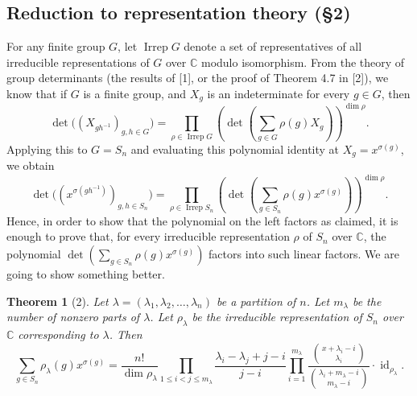 \documentclass[UTF8,11pt,a4paper]{ctexart}
\newtheorem*{theorem}{Theorem}
\theoremstyle{definition}\newtheorem*{definition}{Definition}
\theoremstyle{remark}\newtheorem*{remark}{Remark}
\DeclareMathOperator{\id}{id}
\newcommand{\C}{\mathbb C}
\begin{document}
\subsection*{Reduction to representation theory (\S2)}
For any finite group $G$, let $\operatorname{Irrep}G$ denote a set of representatives of all irreducible representations of $G$ over $\C$ modulo isomorphism. From the theory of group determinants (the results of [1], or the proof of Theorem 4.7 in [2]), we know that if $G$ is a finite group, and $X_g$ is an indeterminate for every $g\in G$, then
\[
\det\bigl((X_{gh^{-1}})_{g,h\in G}\bigr)
=\prod_{\rho\in\operatorname{Irrep}G}
\left(\det\left(\sum_{g\in G}\rho(g)X_g\right)\right)^{\dim\rho}.
\]
Applying this to $G=S_n$ and evaluating this polynomial identity at $X_g=x^{\sigma(g)}$, we obtain
\begin{equation}\label{gr:groupdet}
\det\bigl((x^{\sigma(gh^{-1})})_{g,h\in S_n}\bigr)
=\prod_{\rho\in\operatorname{Irrep}S_n}
\left(\det\left(\sum_{g\in S_n}\rho(g)x^{\sigma(g)}\right)\right)^{\dim\rho}.
\end{equation}
Hence, in order to show that the polynomial on the left factors as claimed, it is enough to prove that, for every irreducible representation $\rho$ of $S_n$ over $\C$, the polynomial $\det(\sum_{g\in S_n}\rho(g)x^{\sigma(g)})$ factors into such linear factors. We are going to show something better.
\begin{theorem}[2]
Let $\lambda=(\lambda_1,\lambda_2,\ldots,\lambda_n)$ be a partition of $n$. Let $m_\lambda$ be the number of nonzero parts of $\lambda$. Let $\rho_\lambda$ be the irreducible representation of $S_n$ over $\C$ corresponding to $\lambda$. Then
\begin{equation}\label{gr:scalar}
\sum_{g\in S_n}\rho_\lambda(g)x^{\sigma(g)}
=\frac{n!}{\dim\rho_\lambda}
\prod_{1\le i<j\le m_\lambda}\frac{\lambda_i-\lambda_j+j-i}{j-i}
\prod_{i=1}^{m_\lambda}
\frac{\binom{x+\lambda_i-i}{\lambda_i}}
{\binom{\lambda_i+m_\lambda-i}{m_\lambda-i}}
\cdot\id_{\rho_\lambda}.
\end{equation}
\end{theorem}
\end{document}
